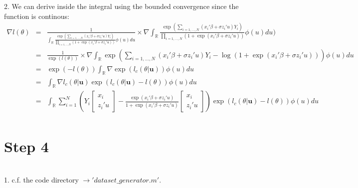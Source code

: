 2.  We can derive inside the integral using the bounded convergence since the function is continous:
\begin{eqnarray*}
	\nabla l(\theta)&=& \frac{1}{\int_{\mathbb{R}} \frac{\exp(\sum_{i=1,\dots,N}(x_i' \beta + \sigma z_i'u) Y_i)}{\prod_{i=1,\dots,N}(1+\exp(x_i' \beta + \sigma z_i'u))} \phi(u) du} \times \nabla \int_{\mathbb{R}} \frac{\exp(\sum_{i=1,\dots,N}(x_i' \beta + \sigma z_i'u) Y_i)}{\prod_{i=1,\dots,N}(1+\exp(x_i' \beta + \sigma z_i'u))} \phi(u) du)\\
						&=& \frac{1}{\exp(l(\theta))}\times \nabla \int_{\mathbb{R}} \exp(\sum_{i=1,\dots,N}(x_i' \beta + \sigma z_i'u) Y_i-\log(1+\exp(x_i' \beta + \sigma z_i'u)))\phi(u)du \\
						&=& \exp(-l(\theta)) \int_{\mathbb{R}} \nabla \exp(l_c(\theta\vert \textbf{u})) \phi(u) du\\
						&=& \int_{\mathbb{R}} \nabla l_c(\theta\vert \textbf{u}) \exp (l_c(\theta\vert \textbf{u})-l(\theta)) \phi(u)du\\
						&=& \int_{\mathbb{R}} \sum_{i=1}^{N} (Y_i\begin{bmatrix}
							x_i\\
							z_i'u
						\end{bmatrix}-\frac{\exp(x_i' \beta + \sigma z_i'u)}{1+\exp(x_i' \beta + \sigma z_i'u)}\begin{bmatrix}
						x_i\\
						z_i'u
					\end{bmatrix}) \exp (l_c(\theta\vert \textbf{u})-l(\theta)) \phi(u)du\\
\end{eqnarray*}




\section*{Step 4}
~\\

1. c.f. the code directory $\rightarrow 'dataset\_generator.m'$.\\
	
